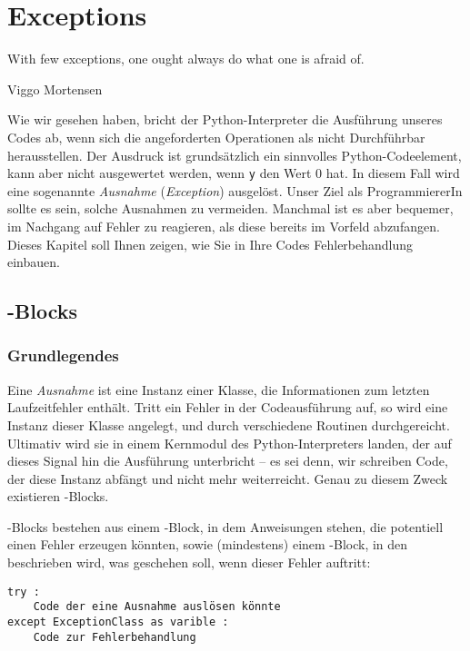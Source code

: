 \chapter{Exceptions}
\label{chp:Exceptions}
\epigraph{
	With few exceptions, one ought always do what one is afraid of.
}{Viggo Mortensen}

Wie wir gesehen haben, bricht der Python-Interpreter die Ausführung unseres Codes ab, wenn sich die angeforderten Operationen als nicht Durchführbar herausstellen. Der Ausdruck  ist grundsätzlich ein sinnvolles Python-Codeelement, kann aber nicht ausgewertet werden, wenn \texttt{y} den Wert 0 hat. In diesem Fall wird eine sogenannte \emph{Ausnahme} (\emph{Exception}) ausgelöst. Unser Ziel als ProgrammiererIn sollte es sein, solche Ausnahmen zu vermeiden. Manchmal ist es aber bequemer, im Nachgang auf Fehler zu reagieren, als diese bereits im Vorfeld abzufangen. Dieses Kapitel soll Ihnen zeigen, wie Sie in Ihre Codes Fehlerbehandlung einbauen.

\section{-Blocks}
\subsection{Grundlegendes}
Eine \emph{Ausnahme} ist eine Instanz einer Klasse, die Informationen zum letzten Laufzeitfehler enthält. Tritt ein Fehler in der Codeausführung auf, so wird eine Instanz dieser Klasse angelegt, und durch verschiedene Routinen durchgereicht. Ultimativ wird sie in einem Kernmodul des Python-Interpreters landen, der auf dieses Signal hin die Ausführung unterbricht -- es sei denn, wir schreiben Code, der diese Instanz abfängt und nicht mehr weiterreicht. Genau zu diesem Zweck existieren -Blocks.

-Blocks bestehen aus einem -Block, in dem Anweisungen stehen, die potentiell einen Fehler erzeugen könnten, sowie (mindestens) einem -Block, in den beschrieben wird, was geschehen soll, wenn dieser Fehler auftritt:

\begin{codebox}
\begin{verbatim}
try :
    Code der eine Ausnahme auslösen könnte
except ExceptionClass as varible :
    Code zur Fehlerbehandlung
\end{verbatim}
\end{codebox}

